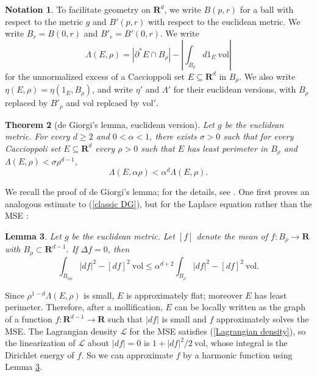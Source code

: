 \documentclass[reqno,12pt,letterpaper]{amsart}
\newcommand{\RR}{\mathbf{R}}
\newcommand{\vol}{\mathrm{vol}}
\newtheorem{theorem}{Theorem}[section]
\newtheorem{lemma}[theorem]{Lemma}
\theoremstyle{definition}
\newtheorem{notation}[theorem]{Notation}
\numberwithin{equation}{section}
\begin{document}
\begin{notation}
To facilitate geometry on $\RR^d$, we write $B(p, r)$ for a ball with respect to the metric $g$ and $B'(p, r)$ with respect to the euclidean metric.
We write $B_r = B(0, r)$ and $B'_r = B'(0, r)$.
We write
$$\Lambda(E, \rho) = |\partial^* E \cap B_\rho| - \left|\int_{B_\rho} d1_E ~\vol\right|$$
for the unnormalized excess of a Caccioppoli set $E \subseteq \RR^d$ in $B_\rho$.
We also write $\eta(E, \rho) = \eta(1_E, B_\rho)$, and write $\eta'$ and $\Lambda'$ for their euclidean versions, with $B_\rho$ replaced by $B'_\rho$ and $\vol$ replcaed by $\vol'$.
\end{notation}

\begin{theorem}[de Giorgi's lemma, euclidean version]
Let $g$ be the euclidean metric.
For every $d \geq 2$ and $0 < \alpha < 1$, there exists $\sigma > 0$ such that for every Caccioppoli set $E \subseteq \RR^d$ every $\rho > 0$ such that $E$ has least perimeter in $B_\rho$ and $\Lambda(E, \rho) < \sigma \rho^{d - 1}$,
\begin{equation}\label{classic DG}
\Lambda(E, \alpha \rho) < \alpha^d \Lambda(E, \rho).
\end{equation}
\end{theorem}

We recall the proof of de Giorgi's lemma; for the details, see \cite[\S4-5]{Miranda66}.
One first proves an analogous estimate to (\ref{classic DG}), but for the Laplace equation rather than the MSE \cite[Lemma 4.1]{Miranda66}:

\begin{lemma}\label{harmonic DG}
Let $g$ be the euclidean metric.
Let $[f]$ denote the mean of $f: B_\rho \to \RR$ with $B_\rho \subset \RR^{d - 1}$.
If $\Delta f = 0$, then
$$\int_{B_{\alpha\rho}} |df|^2 - [df]^2 ~\vol \leq \alpha^{d + 2} \int_{B_\rho} |df|^2 - [df]^2 ~\vol.$$
\end{lemma}

Since $\rho^{1 - d}\Lambda(E, \rho)$ is small, $E$ is approximately flat; moreover $E$ has least perimeter.
Therefore, after a mollification, $E$ can be locally written as the graph of a function $f: \RR^{d - 1} \to \RR$ such that $|df|$ is small and $f$ approximately solves the MSE.
The Lagrangian density $\mathscr L$ for the MSE satisfies (\ref{Lagrangian density}), so the linearization of $\mathscr L$ about $|df| = 0$ is $1 + |df|^2/2 ~\vol$, whose integral is the Dirichlet energy of $f$.
So we can approximate $f$ by a harmonic function using Lemma \ref{harmonic DG}.
\end{document}
